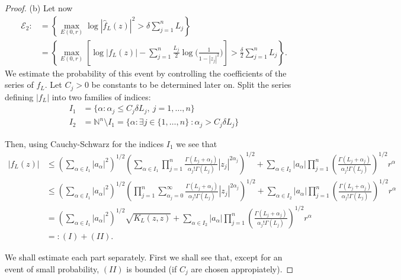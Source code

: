 \documentclass[12pt,twoside,final,amsfonts]{amsart}
\theoremstyle{plain}
\theoremstyle{definition}
\theoremstyle{definition}
\begin{document}
\begin{proof}
 (b) Let now
 \begin{align*}
  \mathcal E_2:&=\left\{\max_{E(0,r)}\log|\hat f_L(z)|^2>\delta {\sum_{j=1}^n L_j}\right\}\\
  &=\left\{\max_{E(0,r)}\left[\log |f_L(z)|-\sum_{j=1}^n\frac{L_j}{2}\log\bigl(\frac{1}{1-|z_j|^2}\bigr)\right]>\frac{\delta}2 {\sum_{j=1}^n L_j}\right\}.
 \end{align*}
We estimate the probability of this event by controlling the coefficients of the series of $f_L$.
Let $C_j>0$ be constants to be determined later on. Split the series defining $|f_L|$ into two families of indices:
\begin{align*}
 I_1&=\bigl\{\alpha : \alpha_j\leq C_j \delta L_j,\ j=1,\dots,n\bigr\} \\
 I_2&=\mathbb N^n\setminus I_1=\bigl\{\alpha : \exists j\in\{1,\dots,n\}\ : \alpha_j> C_j \delta L_j\bigr\}
\end{align*}

Then, using Cauchy-Schwarz for the indices $I_1$ we see that
\begin{align*}
|f_L(z)|&\leq  \left(\sum_{\alpha\in I_1}|a_{\alpha}|^2\right)^{1/2} 
\left(\sum_{\alpha\in I_1} \prod_{j=1}^n \frac{\Gamma(L_j+\alpha_j)}{\alpha_j!\Gamma(L_j)} |z_j|^{2\alpha_j} \right)^{1/2}+
\sum_{\alpha\in I_2}  |a_{\alpha}|  \prod_{j=1}^n \left(\frac{\Gamma(L_j+\alpha_j)}{\alpha_j!\Gamma(L_j)}\right)^{1/2} r^{\alpha}\\
&\leq \left(\sum_{\alpha\in I_1}|a_{\alpha}|^2\right)^{1/2} \left(\prod_{j=1}^n \sum_{\alpha_j=0}^\infty \frac{\Gamma(L_j+\alpha_j)}{\alpha_j!\Gamma(L_j)} |z_j|^{2\alpha_j}\right)^{1/2} +\sum_{\alpha\in I_2}  |a_{\alpha}|  \prod_{j=1}^n \left(\frac{\Gamma(L_j+\alpha_j)}{\alpha_j!\Gamma(L_j)}\right)^{1/2} r^{\alpha}\\
&= \left(\sum_{\alpha\in I_1}|a_{\alpha}|^2\right)^{1/2} \sqrt{K_L(z,z)}+ \sum_{\alpha\in I_2}  |a_{\alpha}|  \prod_{j=1}^n \left(\frac{\Gamma(L_j+\alpha_j)}{\alpha_j!\Gamma(L_j)}\right)^{1/2} r^{\alpha}\\
&=:(I)+(II).\nonumber
\end{align*}

We shall estimate each part separately. First we shall see that, except for an event of small probability, $(II)$ is bounded (if $C_j$ are chosen appropiately). 


\end{proof}
\end{document}
